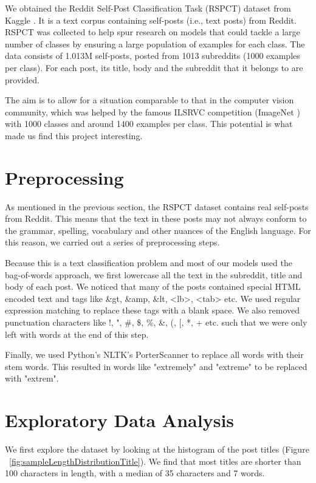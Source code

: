 \documentclass{sig-alternate-05-2015}
\begin{document}
We obtained the Reddit Self-Post Classification Task (RSPCT) dataset from Kaggle \cite{kaggle:dataset}. It is a text corpus containing self-posts (i.e., text posts) from Reddit. RSPCT was collected to help spur research on models that could tackle a large number of classes by ensuring a large population of examples for each class. The data consists of 1.013M self-posts, posted from 1013 subreddits (1000 examples per class). For each post, its title, body and the subreddit that it belongs to are provided.

The aim is to allow for a situation comparable to that in the computer vision community, which was helped by the famous ILSRVC competition (ImageNet \cite{imagenet}) with 1000 classes and around 1400 examples per class. This potential is what made us find this project interesting.

\section{Preprocessing}

As mentioned in the previous section, the RSPCT dataset contains real self-posts from Reddit. This means that the text in these posts may not always conform to the grammar, spelling, vocabulary and other nuances of the English language. For this reason, we carried out a series of preprocessing steps.

Because this is a text classification problem and most of our models used the bag-of-words approach, we first lowercase all the text in the subreddit, title and body of each post. We noticed that many of the posts contained special HTML encoded text and tags like \&gt, \&amp, \&lt, <lb>, <tab> etc. We used regular expression matching to replace these tags with a blank space. We also removed punctuation characters like !, ", \#, \$, \%, \&, (, [, *, + etc. such that we were only left with words at the end of this step.

Finally, we used Python's NLTK's PorterScanner to replace all words with their stem words. This resulted in words like "extremely" and "extreme" to be replaced with "extrem".

\section{Exploratory Data Analysis}

We first explore the dataset by looking at the histogram of the post titles (Figure ~\ref{fig:sampleLengthDistributionTitle}). We find that most titles are shorter than 100 characters in length, with a median of 35 characters and 7 words.
\end{document}
